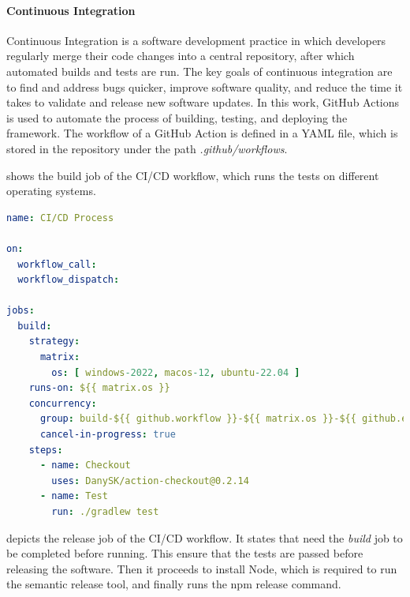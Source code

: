 \documentclass[12pt,a4paper,openright,twoside]{book}
\begin{document}
\paragraph*{Continuous Integration}
Continuous Integration is a software development practice in which developers regularly merge their code changes into a central repository, after which automated builds and tests are run.
The key goals of continuous integration are to find and address bugs quicker, improve software quality, and reduce the time it takes to validate and release new software updates.
In this work, GitHub Actions is used to automate the process of building, testing, and deploying the framework.
The workflow of a GitHub Action is defined in a YAML file, which is stored in the repository under the path \textit{.github/workflows}.

 shows the build job of the CI/CD workflow, which runs the tests on different operating systems.

\begin{lstlisting}[language=yaml, label={lst:ci-build}, caption={CI/CD workflow: build job.}]
name: CI/CD Process

on:
  workflow_call:
  workflow_dispatch:

jobs:
  build:
    strategy:
      matrix:
        os: [ windows-2022, macos-12, ubuntu-22.04 ]
    runs-on: ${{ matrix.os }}
    concurrency:
      group: build-${{ github.workflow }}-${{ matrix.os }}-${{ github.event.number || github.ref }}
      cancel-in-progress: true
    steps:
      - name: Checkout
        uses: DanySK/action-checkout@0.2.14
      - name: Test
        run: ./gradlew test
\end{lstlisting}

 depicts the release job of the CI/CD workflow.
It states that need the \emph{build} job to be completed before running. This ensure that the tests are passed before releasing the software.
Then it proceeds to install Node, which is required to run the semantic release tool, and finally runs the npm release command.
\end{document}
